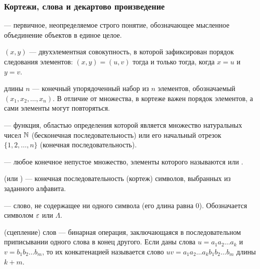 \subsubsection{Кортежи, слова и декартово произведение}

\begin{definition}
     --- первичное, неопределяемое строго понятие, 
    обозначающее мысленное объединение объектов в единое целое.
\end{definition}

\begin{definition}
     $(x, y)$ --- двухэлементная совокупность, 
    в которой зафиксирован порядок следования элементов: $(x, y) = (u, v)$ 
    тогда и только тогда, когда $x = u$ и $y = v$.
\end{definition}

\begin{definition}
     длины $n$ --- конечный упорядоченный набор из $n$ 
    элементов, обозначаемый $(x_1, x_2, \dots, x_n)$. В отличие от 
    множества, в кортеже важен порядок элементов, а сами элементы могут 
    повторяться.
\end{definition}

\begin{definition}
     --- функция, областью определения которой 
    является множество натуральных чисел $\mathbb{N}$ (бесконечная 
    последовательность) или его начальный отрезок $\{1, 2, \dots, n\}$ 
    (конечная последовательность).
\end{definition}

\begin{definition}
     --- любое конечное непустое множество, элементы 
    которого называются  или .
\end{definition}

\begin{definition}
     (или ) --- конечная 
    последовательность (кортеж) символов, выбранных из заданного алфавита.
\end{definition}

\begin{definition}
     --- слово, не содержащее ни одного символа 
    (его длина равна $0$). Обозначается символом $\varepsilon$ или $\Lambda$.
\end{definition}

\begin{definition}
     (сцепление) слов --- бинарная операция, 
    заключающаяся в последовательном приписывании одного слова в конец 
    другого. Если даны слова $u = a_1 a_2 \dots a_k$ и 
    $v = b_1 b_2 \dots b_m$, то их конкатенацией называется слово 
    $u v = a_1 a_2 \dots a_k b_1 b_2 \dots b_m$ длины $k + m$.
\end{definition}


